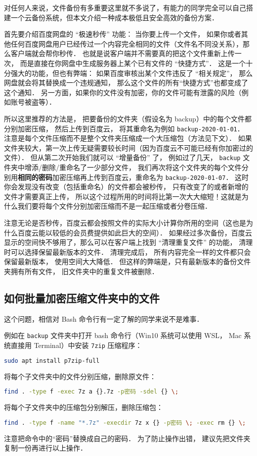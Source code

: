 
对任何人来说，文件备份有多重要这里就不多说了，有能力的同学完全可以自己搭建一个云备份系统，但本文介绍一种成本极低且安全高效的备份方案．

首先要介绍百度网盘的 “极速秒传” 功能： 当你要上传一个文件， 如果你或者其他任何百度网盘用户已经传过一个内容完全相同的文件（文件名不同没关系），那么客户端就会帮你秒传． 也就是说客户端并不需要真的把这个文件重新上传一次， 而是直接在你网盘中生成服务器上某个已有文件的 “快捷方式”． 这是一个十分强大的功能，但也有弊端： 如果百度审核出某个文件违反了 “相关规定”， 那么网盘就会将其替换成一个违规通知， 那么这个文件的所有“快捷方式”也都变成了这个通知． 另一方面，如果你的文件没有加密，你的文件可能有泄露的风险（例如账号被盗等）．

所以这里推荐的方法是， 把要备份的文件夹（假设名为 backup）中的每个文件都分别加密压缩， 然后上传到百度云， 将其重命名为例如 \verb|backup-2020-01-01|． 注意是每个文件压缩而不是整个文件夹压缩成一个大压缩包（方法见下文）． 如果文件夹较大，第一次上传无疑需要较长时间（因为百度云不可能已经有你加密过的文件）． 但从第二次开始我们就可以 “增量备份” 了， 例如过了几天， \verb|backup| 文件夹中增添/删除/重命名了一少部分文件， 我们再次将这个文件夹的每个文件分别用\textbf{相同的密码}加密压缩再上传到百度云，重命名为 \verb|backup-2020-01-07|． 这时你会发现没有改变（包括重命名）的文件都会被秒传， 只有改变了的或者新增的文件才需要真正上传， 所以这个过程所用的时间将比第一次大大缩短！这就是为什么我们要将每个文件分别加密压缩而不是一起压缩或者分卷压缩．

注意无论是否秒传，百度云都会按照文件的实际大小计算你所用的空间（这也是为什么百度云能以较低的会员费提供如此巨大的空间）． 如果经过多次备份，百度云显示的空间快不够用了，那么可以在客户端上找到 “清理重复文件” 的功能， 清理时可以选择保留最新版本的文件． 清理完成后， 所有内容完全一样的文件都只会保留最新版本， 使用空间大大降低． 但这样的弊端是，只有最新版本的备份文件夹拥有所有文件， 旧文件夹中的重复文件被删除．

\subsection{如何批量加密压缩文件夹中的文件}

这个问题，相信对 Bash 命令行有一定了解的同学来说不是难事．

例如在 \verb|backup| 文件夹中打开 bash 命令行（Win10 系统可以使用 WSL， Mac 系统直接用 Terminal）中安装 \verb|7zip| 压缩程序：
\begin{lstlisting}[language=bash]
sudo apt install p7zip-full
\end{lstlisting}
将每个子文件夹中的文件分别压缩，删除原文件：
\begin{lstlisting}[language=bash]
find . -type f -exec 7z a {}.7z -p密码 -sdel {} \;
\end{lstlisting}
将每个子文件夹中的压缩包分别解压，删除压缩包：
\begin{lstlisting}[language=bash]
find . -type f -name "*.7z" -execdir 7z x {} -p密码 \; -exec rm {} \;
\end{lstlisting}
注意把命令中的“密码”替换成自己的密码． 为了防止操作出错， 建议先把文件夹复制一份再进行以上操作．

